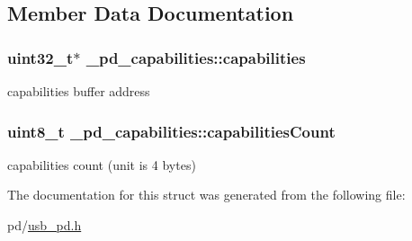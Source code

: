 \subsection{Member Data Documentation}
\hypertarget{struct__pd__capabilities_a559fdae7ddb5376491caf869366e7e71}{
\subsubsection[{capabilities}]{\setlength{\rightskip}{0pt plus 5cm}uint32\-\_\-t$\ast$ \-\_\-pd\-\_\-capabilities\-::capabilities}}\label{struct__pd__capabilities_a559fdae7ddb5376491caf869366e7e71}
capabilities buffer address \hypertarget{struct__pd__capabilities_a240b859a2ffe7e634479a22c3f3e4feb}{
\subsubsection[{capabilities\-Count}]{\setlength{\rightskip}{0pt plus 5cm}uint8\-\_\-t \-\_\-pd\-\_\-capabilities\-::capabilities\-Count}}\label{struct__pd__capabilities_a240b859a2ffe7e634479a22c3f3e4feb}
capabilities count (unit is 4 bytes) 

The documentation for this struct was generated from the following file\-:\begin{DoxyCompactItemize}
\item 
pd/\hyperlink{usb__pd_8h}{usb\-\_\-pd.\-h}\end{DoxyCompactItemize}
